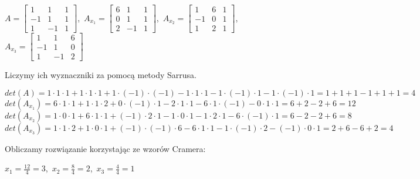 \documentclass{article}
\begin{document}
\begin{center}
    $A = \begin{bmatrix}1&1&1\\-1&1&1\\1&-1&1\end{bmatrix}$,\ 
    $A_{x_1} = \begin{bmatrix}6&1&1\\0&1&1\\2&-1&1\end{bmatrix}$,\ 
    $A_{x_2} = \begin{bmatrix}1&6&1\\-1&0&1\\1&2&1\end{bmatrix}$,\ 
    $A_{x_3} = \begin{bmatrix}1&1&6\\-1&1&0\\1&-1&2\end{bmatrix}$

\end{center}
\noindent
Liczymy ich wyznaczniki za pomocą metody Sarrusa.

\begin{center}
    $det(A) = 1 \cdot 1 \cdot 1 + 1 \cdot 1 \cdot 1 + 1 \cdot (-1) 
    \cdot (-1) - 1 \cdot 1 \cdot 1 - 1 \cdot (-1) \cdot 1 - 1 \cdot (-1) \cdot 1 = 1 + 1 + 1 - 1 + 1 + 1 = 4$\\
    $det(A_{x_1}) = 6 \cdot 1 \cdot 1 + 1 \cdot 1 \cdot 2 + 0 \cdot (-1) \cdot 1 - 2 \cdot 1 \cdot 1 - 6 \cdot 1 \cdot (-1) - 0 
    \cdot 1 \cdot 1 = 6 + 2 - 2 + 6 = 12$\\
    $det(A_{x_2} ) = 1 \cdot 0 \cdot 1 + 6 \cdot 1 \cdot 1 + (-1) 
    \cdot 2 \cdot 1 - 1 \cdot 0 \cdot 1 - 1 \cdot 2 \cdot 1 - 6 
    \cdot (-1) \cdot 1 = 6 - 2 - 2 + 6 = 8$\\
    $det(A_{x_3} ) = 1 \cdot 1 \cdot 2 + 1 \cdot 0 \cdot 1 + (-1) 
    \cdot (-1) \cdot 6 - 6 \cdot 1 \cdot 1 - 1 \cdot (-1) \cdot 2 - (-1) \cdot 0 \cdot 1 = 2 + 6 - 6 + 2 = 4$
\end{center}
\noindent
Obliczamy rozwiązanie korzystając ze wzorów Cramera:
\begin{center}
    $x_1 = \frac{12}{4} = 3$,\ 
    $x_2 = \frac{8}{4} = 2$,\ 
    $x_3 = \frac{4}{4} = 1$
\end{center}
\end{document}
